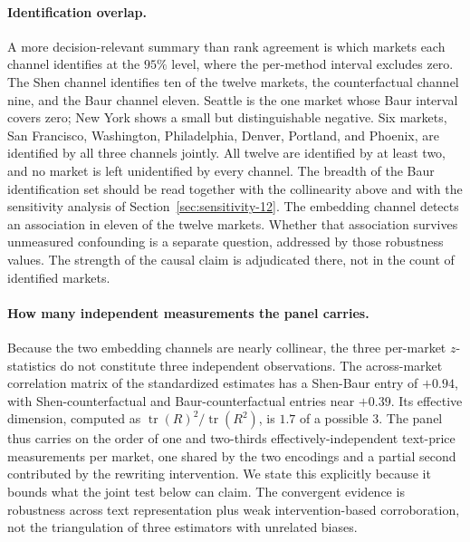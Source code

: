 \paragraph{Identification overlap.} A more decision-relevant summary than rank
agreement is which markets each channel identifies at the $95\%$ level, where
the per-method interval excludes zero. The Shen channel identifies ten of the twelve markets, the counterfactual channel nine, and the Baur channel eleven. Seattle is the one market whose Baur interval covers zero; New York shows a small but distinguishable negative. Six markets, San Francisco, Washington, Philadelphia, Denver, Portland, and Phoenix, are identified by all three channels jointly. All twelve are identified by at least two, and no market is left unidentified by every channel.
The breadth of the Baur identification set should be read together with the collinearity above and with the sensitivity analysis of Section~\ref{sec:sensitivity-12}. The embedding channel detects an association in eleven of the twelve markets. Whether that association survives unmeasured confounding is a separate question, addressed by those robustness values. The strength of the causal claim is adjudicated there, not in the count of identified markets.

\paragraph{How many independent measurements the panel carries.} Because the two
embedding channels are nearly collinear, the three per-market $z$-statistics do
not constitute three independent observations. The across-market correlation matrix of the standardized estimates has a Shen-Baur entry of $+0.94$, with Shen-counterfactual and Baur-counterfactual entries near $+0.39$. Its effective dimension, computed as $\operatorname{tr}(R)^2 / \operatorname{tr}(R^2)$, is $1.7$ of a possible $3$. The panel thus carries on the order of one and
two-thirds effectively-independent text-price measurements per market, one
shared by the two encodings and a partial second contributed by the rewriting
intervention. We state this explicitly because it bounds what the joint test below can claim. The convergent evidence is robustness across text representation plus weak intervention-based corroboration, not the triangulation of three estimators with unrelated biases.

